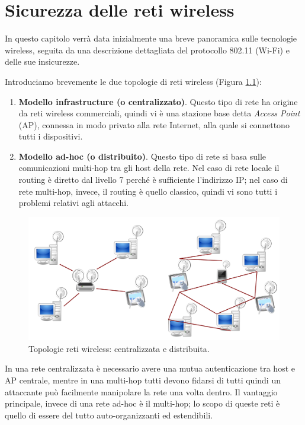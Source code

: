 \chapter{Sicurezza delle reti wireless}
In questo capitolo verrà data inizialmente una breve panoramica sulle tecnologie wireless, seguita da una descrizione dettagliata del protocollo 802.11 (Wi-Fi) e delle sue insicurezze.

Introduciamo brevemente le due topologie di reti wireless (Figura \ref{img:wireless-topology}):
\begin{enumerate}
	\item \textbf{Modello infrastructure (o centralizzato)}. Questo tipo di rete ha origine da reti wireless commerciali, quindi vi è una stazione base detta \textit{Access Point} (AP), connessa in modo privato alla rete Internet, alla quale si connettono tutti i dispositivi.
	\item \textbf{Modello ad-hoc (o distribuito)}. Questo tipo di rete si basa sulle comunicazioni multi-hop tra gli host della rete. Nel caso di rete locale il routing è diretto dal livello 7 perché è sufficiente l'indirizzo IP; nel caso di rete multi-hop, invece, il routing è quello classico, quindi vi sono tutti i problemi relativi agli attacchi.
\end{enumerate}
\begin{figure}[htbp]
	\centering
	\includegraphics[scale = 0.4]{images/wireless-topology}
	\caption{Topologie reti wireless: centralizzata e distribuita.}
	\label{img:wireless-topology}
\end{figure}
In una rete centralizzata è necessario avere una mutua autenticazione tra host e AP centrale, mentre in una multi-hop tutti devono fidarsi di tutti quindi un attaccante può facilmente manipolare la rete una volta dentro. Il vantaggio principale, invece di una rete ad-hoc è il multi-hop; lo scopo di queste reti è quello di essere del tutto auto-organizzanti ed estendibili.

